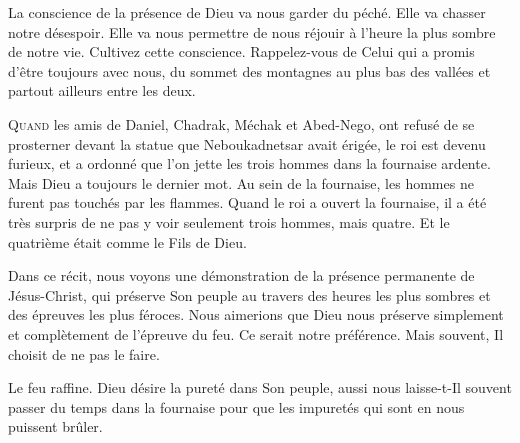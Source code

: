 La conscience de la présence de Dieu va nous garder du péché.
 Elle va chasser notre désespoir. Elle va nous permettre de nous réjouir
 à l'heure la plus sombre de notre vie. Cultivez cette conscience.
 Rappelez-vous de Celui qui a promis d'être toujours avec nous,
 du sommet des montagnes au plus bas des vallées
 et partout ailleurs entre les deux.

\dvrule







\lettrine{Q}{uand} les amis de Daniel, Chadrak, Méchak et Abed-Nego,
 ont refusé de se prosterner devant la statue que Neboukadnetsar avait érigée,
 le roi est devenu furieux, et a ordonné que l'on jette les trois hommes
 dans la fournaise ardente. Mais Dieu a toujours le dernier mot.
 Au sein de la fournaise, les hommes ne furent pas touchés par les flammes.
 Quand le roi a ouvert la fournaise, il a été très surpris de ne pas y voir
 seulement trois hommes, mais quatre.
 Et le quatrième était comme \Og le Fils de Dieu. \Fg{}

Dans ce récit, nous voyons une démonstration de la présence permanente
 de Jésus-Christ, qui préserve Son peuple au travers des heures
 les plus sombres et des  épreuves les plus féroces.
 Nous aimerions que Dieu nous préserve simplement et complètement
 de l'épreuve du feu. Ce serait notre préférence.
 Mais souvent, Il choisit de ne pas le faire. 


Le feu raffine. Dieu désire la pureté dans Son peuple,
 aussi nous laisse-t-Il souvent passer du temps dans la fournaise
 pour que les impuretés qui sont en nous puissent brûler. 

